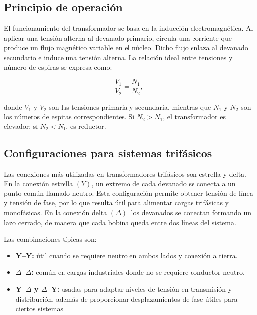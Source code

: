 	\subsection{Principio de operación}
	
	El funcionamiento del transformador se basa en la inducción electromagnética. Al aplicar una tensión alterna al devanado primario, circula una corriente que produce un flujo magnético variable en el núcleo. Dicho flujo enlaza al devanado secundario e induce una tensión alterna. La relación ideal entre tensiones y número de espiras se expresa como:
	
	\begin{equation}
		\frac{V_1}{V_2}=\frac{N_1}{N_2},
	\end{equation}
	
	donde \(V_1\) y \(V_2\) son las tensiones primaria y secundaria, mientras que \(N_1\) y \(N_2\) son los números de espiras correspondientes. Si \(N_2>N_1\), el transformador es elevador; si \(N_2<N_1\), es reductor.
	
	\subsection{Configuraciones para sistemas trifásicos}
	
	Las conexiones más utilizadas en transformadores trifásicos son estrella y delta. En la conexión estrella \((Y)\), un extremo de cada devanado se conecta a un punto común llamado neutro. Esta configuración permite obtener tensión de línea y tensión de fase, por lo que resulta útil para alimentar cargas trifásicas y monofásicas. En la conexión delta \((\Delta)\), los devanados se conectan formando un lazo cerrado, de manera que cada bobina queda entre dos líneas del sistema.
	
	Las combinaciones típicas son:
	
	\begin{itemize}[leftmargin=1.2cm]
		\item \textbf{Y--Y:} útil cuando se requiere neutro en ambos lados y conexión a tierra.
		\item \textbf{\(\Delta\)--\(\Delta\):} común en cargas industriales donde no se requiere conductor neutro.
		\item \textbf{Y--\(\Delta\) y \(\Delta\)--Y:} usadas para adaptar niveles de tensión en transmisión y distribución, además de proporcionar desplazamientos de fase útiles para ciertos sistemas.
	\end{itemize}
	
